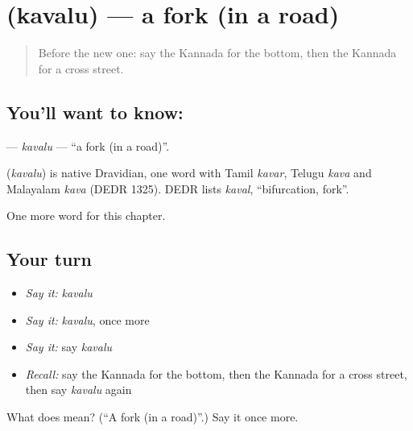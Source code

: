 \section[\texorpdfstring{\kn{ಕವಲು} (kavalu)}{ಕವಲು (kavalu)}]{ (kavalu) — a fork (in a road)}

\label{lesson:KA-C214-kavalu}



\begin{quote}
Before the new one: say the Kannada for the bottom, then the Kannada for a cross street.
\end{quote}

\subsection*{You'll want to know: }
\textbf{} — \emph{kavalu} — \textquotedblleft{}a fork (in a road)\textquotedblright{}.

\begin{cousinweb}
\textbf{} (\emph{kavalu}) is native Dravidian, one word with Tamil \emph{kavar}, Telugu \emph{kava} and Malayalam \emph{kava} (DEDR 1325). DEDR lists \emph{kaval}, \textquotedblleft{}bifurcation, fork\textquotedblright{}.
\end{cousinweb}

\begin{grammarlens}[title={What you've built}]
One more word for this chapter.
\end{grammarlens}

\subsection*{Your turn}
\begin{itemize}
\raggedright
  \item \emph{Say it:} \emph{kavalu}
  \item \emph{Say it:} \emph{kavalu}, once more
  \item \emph{Say it:} say \emph{kavalu}
  \item \emph{Recall:} say the Kannada for the bottom, then the Kannada for a cross street, then say \emph{kavalu} again
\end{itemize}

\begin{tcolorbox}[breakable,colback=teal!4,colframe=teal!35!black,title={Before you move on}]
What does  mean? (\textquotedblleft{}A fork (in a road)\textquotedblright{}.) Say it once more.
\end{tcolorbox}
